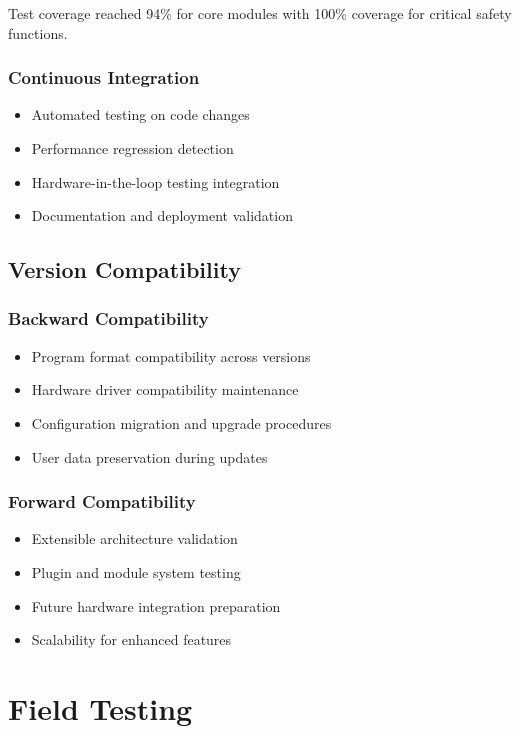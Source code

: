 Test coverage reached 94\% for core modules with 100\% coverage for critical safety functions.

\subsubsection{Continuous Integration}
\begin{itemize}
    \item Automated testing on code changes
    \item Performance regression detection
    \item Hardware-in-the-loop testing integration
    \item Documentation and deployment validation
\end{itemize}

\subsection{Version Compatibility}

\subsubsection{Backward Compatibility}
\begin{itemize}
    \item Program format compatibility across versions
    \item Hardware driver compatibility maintenance
    \item Configuration migration and upgrade procedures
    \item User data preservation during updates
\end{itemize}

\subsubsection{Forward Compatibility}
\begin{itemize}
    \item Extensible architecture validation
    \item Plugin and module system testing
    \item Future hardware integration preparation
    \item Scalability for enhanced features
\end{itemize}

\section{Field Testing}

